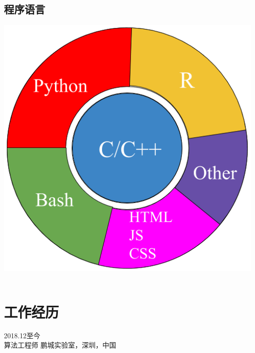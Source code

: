 \documentclass[]{friggeri-cv}
\begin{document}
\begin{aside}
  \section{程序语言}
    \includegraphics[scale=0.2]{img/programming.png}
    ~
\end{aside}

\section{工作经历}
\begin{entrylist}
  \entry
  {2018.12至今\\}
  {\large{算法工程师}}
  {鹏城实验室，深圳，中国}
  {}
\end{entrylist}
\end{document}
